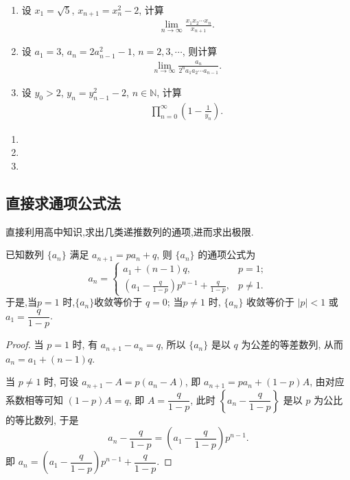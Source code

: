 \documentclass[../../main.tex]{subfiles}
\begin{document}
\begin{example}
\begin{enumerate}
\item 设 $x_1 = \sqrt{5}$, $x_{n+1} = x_n^2 - 2$, 计算
\begin{align*}
\lim_{n \to \infty} \frac{x_1 x_2 \cdots x_n}{x_{n+1}}.
\end{align*}
\item 设 $a_1 = 3$, $a_n = 2a_{n-1}^2 - 1$, $n = 2, 3, \cdots$, 则计算
\begin{align*}
\lim_{n \to \infty} \frac{a_n}{2^n a_1 a_2 \cdots a_{n-1}}.
\end{align*}
\item 设 $y_0 > 2$, $y_n = y_{n-1}^2 - 2$, $n \in \mathbb{N}$, 计算
\begin{align*}
\prod_{n=0}^{\infty} \left(1 - \frac{1}{y_n}\right).
\end{align*}
\end{enumerate}
\end{example}
\begin{solution}
\begin{enumerate}
\item 

\item 

\item 
\end{enumerate}
\end{solution}


\subsection{直接求通项公式法}

直接利用高中知识,求出几类递推数列的通项,进而求出极限.

\begin{proposition}\label{proposition:可直接求通项--类型一}
已知数列 $\{a_n\}$ 满足 $a_{n+1} = p a_n + q$, 则 $\{a_n\}$ 的通项公式为
\[
a_n = 
\begin{cases} 
a_1 + (n - 1)q, & p = 1; \\
\displaystyle \left( a_1 - \frac{q}{1 - p} \right) p^{n - 1} + \frac{q}{1 - p}, & p \neq 1.
\end{cases}
\]
于是,当$p = 1$ 时,$\{a_n\}$收敛等价于 $q = 0$;
当$p \neq 1$ 时, $\{a_n\}$ 收敛等价于 $|p| < 1$ 或 $a_1 = \dfrac{q}{1 - p}$.
\end{proposition}
\begin{proof}
当 $p = 1$ 时, 有 $a_{n + 1} - a_n = q$, 所以 $\{a_n\}$ 是以 $q$ 为公差的等差数列, 从而 $a_n = a_1 + (n - 1)q$.

当 $p \neq 1$ 时, 可设 $a_{n + 1} - A = p(a_n - A)$, 即 $a_{n + 1} = p a_n + (1 - p)A$, 由对应系数相等可知 $(1 - p)A = q$, 即 $A = \dfrac{q}{1 - p}$, 此时 $\left\{ a_n - \dfrac{q}{1 - p} \right\}$ 是以 $p$ 为公比的等比数列, 于是
\[
a_n - \frac{q}{1 - p} = \left( a_1 - \frac{q}{1 - p} \right) p^{n - 1}.
\]
即 $a_n = \left( a_1 - \dfrac{q}{1 - p} \right) p^{n - 1} + \dfrac{q}{1 - p}$. 
\end{proof}
\end{document}
